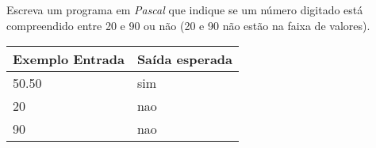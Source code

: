 \item Escreva um programa em \emph{Pascal} que indique se um número digitado está compreendido entre 20 e 90 ou não (20 e 90 não estão na faixa de valores).

\begin{center}
\begin{tabular}{|l|l|} \hline
Exemplo Entrada & Saída esperada \\ \hline
50.50                & sim               \\ \hline
20                & nao               \\ \hline
90                & nao               \\ \hline
\end{tabular}
\end{center}